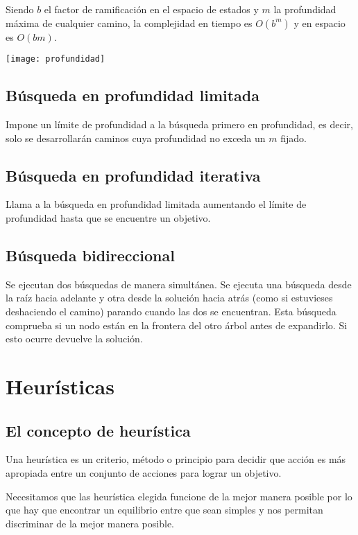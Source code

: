 \documentclass[12pt]{article}
\begin{document}
Siendo $b$ el factor de ramificación en el espacio de estados y 
$m$ la profundidad máxima de cualquier camino, la complejidad 
en tiempo es $O(b^m)$ y en espacio es $O(bm)$.

\texttt{[image: profundidad]}

\subsection{Búsqueda en profundidad limitada}

Impone un límite de profundidad a la búsqueda primero en profundidad, 
es decir, solo se desarrollarán caminos cuya profundidad no exceda un $m$ fijado.

\subsection{Búsqueda en profundidad iterativa}

Llama a la búsqueda en profundidad limitada aumentando el límite de 
profundidad hasta que se encuentre un objetivo.

\subsection{Búsqueda bidireccional}

Se ejecutan dos búsquedas de manera simultánea. Se ejecuta una
búsqueda desde la raíz hacia adelante y otra desde la solución hacia
atrás (como si estuvieses deshaciendo el camino) parando cuando las
dos se encuentran. Esta búsqueda comprueba si un nodo están en la
frontera del otro árbol antes de expandirlo. Si esto ocurre devuelve
la solución.


\section{Heurísticas}

\subsection{El concepto de heurística}

Una heurística es un criterio, método o principio para decidir que acción
es más apropiada entre un conjunto de acciones para lograr un
objetivo.

Necesitamos que las heurística elegida funcione de la mejor manera
posible por lo que hay que encontrar un equilibrio entre que sean
simples y nos permitan discriminar de la mejor manera posible.
\end{document}
